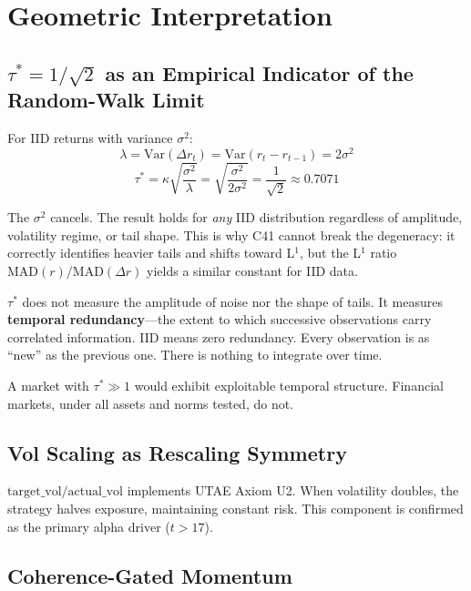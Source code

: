 \documentclass[11pt,a4paper]{article}
\begin{document}
\section{Geometric Interpretation}

\subsection{$\tau^* = 1/\sqrt{2}$ as an Empirical Indicator of the Random-Walk Limit}

For IID returns with variance $\sigma^2$:
\begin{equation}
  \lambda = \mathrm{Var}(\Delta r_t) = \mathrm{Var}(r_t - r_{t-1}) = 2\sigma^2
\end{equation}
\begin{equation}
  \tau^* = \kappa\sqrt{\frac{\sigma^2}{\lambda}} = \sqrt{\frac{\sigma^2}{2\sigma^2}} = \frac{1}{\sqrt{2}} \approx 0.7071
\end{equation}

The $\sigma^2$ cancels. The result holds for \emph{any} IID distribution regardless of amplitude, volatility regime, or tail shape. This is why C41 cannot break the degeneracy: it correctly identifies heavier tails and shifts toward L$^1$, but the L$^1$ ratio $\mathrm{MAD}(r)/\mathrm{MAD}(\Delta r)$ yields a similar constant for IID data.

$\tau^*$ does not measure the amplitude of noise nor the shape of tails. It measures \textbf{temporal redundancy}---the extent to which successive observations carry correlated information. IID means zero redundancy. Every observation is as ``new'' as the previous one. There is nothing to integrate over time.

A market with $\tau^* \gg 1$ would exhibit exploitable temporal structure. Financial markets, under all assets and norms tested, do not.

\subsection{Vol Scaling as Rescaling Symmetry}

$\mathrm{target\_vol} / \mathrm{actual\_vol}$ implements UTAE Axiom U2. When volatility doubles, the strategy halves exposure, maintaining constant risk. This component is confirmed as the primary alpha driver ($t > 17$).

\subsection{Coherence-Gated Momentum}
\end{document}
